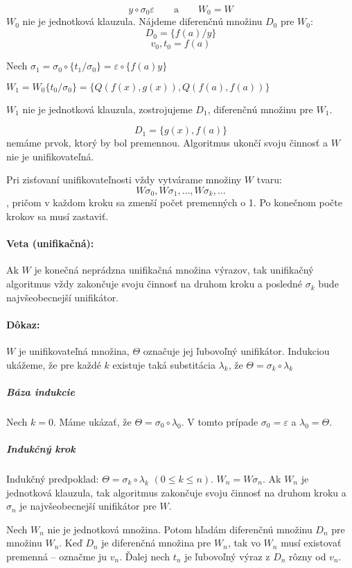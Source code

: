 	$$y\circ \sigma_0 \varepsilon \qquad \mbox{a} \qquad W_0 = W$$
$W_0$ nie je jednotková klauzula. Nájdeme diferenčnú množinu $D_0$ pre $W_0$:
$$D_0 = \{ f(a)/y \}$$
$$v_0, t_0 = f(a)$$

Nech $\sigma_1 = \sigma_0 \circ \{ t_1/\sigma_0\} = \varepsilon \circ  \{
f(a)y\}$

$W_1 = W_0 \{ t_0/\sigma_0\} = \{ Q(f(x),g(x)), Q(f(a),f(a))\}$

$W_1$ nie je jednotková klauzula, zostrojujeme $D_1$, diferenčnú množinu
pre $W_1$.


$$D_1 = \{ g(x), f(a)\}$$ nemáme prvok, ktorý by bol premennou. Algoritmus
ukončí svoju činnosť a $W$ nie je unifikovateľná.

\par Pri zisťovaní unifikovateľnosti vždy vytvárame množiny $W$ tvaru:
$$W\sigma_0, W\sigma_1, \ldots, W\sigma_k, \ldots$$, pričom v každom kroku sa
zmenší počet premenných o 1. Po konečnom počte krokov sa musí zastaviť.


\paragraph{Veta (unifikačná):} Ak $W$ je konečná neprádzna unifikačná množina
výrazov, tak unifikačný algoritmus vždy zakončuje svoju činnosť na druhom kroku
a posledné $\sigma_k$ bude najvšeobecnejší unifikátor.

\paragraph{Dôkaz:} $W$ je unifikovateľná množina, $\Theta$ označuje jej
ľubovoľný unifikátor. Indukciou ukážeme, že pre každé $k$ existuje taká
substitácia $\lambda_k$, že $\Theta = \sigma_k \circ \lambda_k$

\subparagraph{Báza indukcie} Nech $k = 0$. Máme ukázať, že $\Theta = \sigma_0
\circ \lambda_0$. V tomto prípade $\sigma_0 = \varepsilon$ a $\lambda_0 =
\Theta$.

\subparagraph{Indukčný krok} Indukčný predpoklad: $\Theta = \sigma_k \circ
\lambda_k$ $(0 \leq k \leq n)$. $W_n = W\sigma_n$. Ak $W_n$ je jednotková
klauzula, tak algoritmus zakončuje svoju činnosť na druhom kroku a $\sigma_n$ je
najvšeobecnejší unifikátor pre $W$. 
\par Nech $W_n$ nie je jednotková množina. Potom hľadám diferenčnú množinu $D_n
$ pre množinu $W_n$. Keď $D_n$ je diferenčná množina pre $W_n$, tak vo $W_n$
musí existovať premenná -- označme ju $v_n$. Ďalej nech $t_n$ je ľubovoľný výraz
z $D_n$ rôzny od $v_n$.

